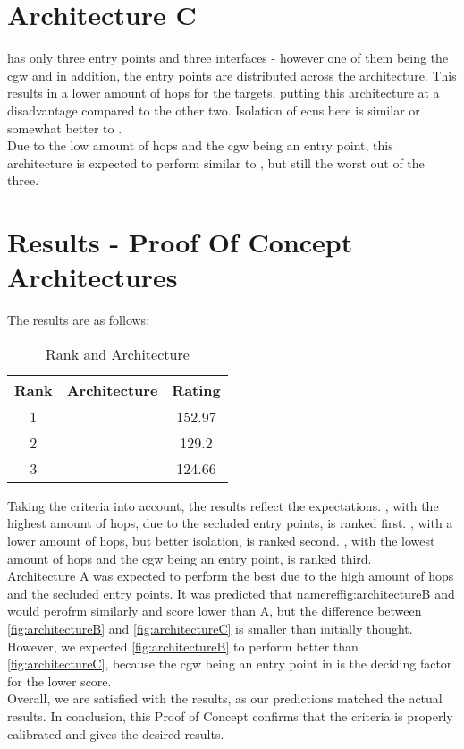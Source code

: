 \section{Architecture C}
\label{sec:archc}

 has only three entry points and three interfaces - however one of them being the \gls{cgw} and 
in addition, the entry points are distributed across the architecture. 
This results in a lower amount of hops for the targets, putting this architecture at a disadvantage compared to the other two.
Isolation of \gls{ecu}s here is similar or somewhat better to .\\
Due to the low amount of hops and the \gls{cgw} being an entry point, this architecture is expected to perform 
similar to , but still the worst out of the three.


\section{Results - Proof Of Concept Architectures}
\label{sec:resultsproof}

The results are as follows:

\begin{table}[h]
    \label{table:survey}
    \centering
    \caption{Rank and Architecture}
    \begin{tabular}{ |c|c|c| } 
    \hline
    Rank & Architecture & Rating\\
    \hline
    1 & \nameref{fig:architectureA} & 152.97\\ 
    2 & \nameref{fig:architectureB} & 129.2\\
    3 & \nameref{fig:architectureC} & 124.66\\
    \hline
    \end{tabular}
\end{table}

Taking the criteria into account, the results reflect the expectations.
, with the highest amount of hops, due to the secluded entry points, is ranked first.
, with a lower amount of hops, but better isolation, is ranked second.
, with the lowest amount of hops and the \gls{cgw} being an entry point, is ranked third.\\

Architecture A was expected to perform the best due to the high amount of hops and the secluded entry points.
It was predicted that nameref{fig:architectureB} and  would perofrm similarly and score lower than A,
but the difference between \ref{fig:architectureB} and \ref{fig:architectureC} is smaller than initially thought. 
However, we expected \ref{fig:architectureB} to perform better than \ref{fig:architectureC}, 
because the \gls{cgw} being an entry point in  is the deciding factor for the lower score.\\

Overall, we are satisfied with the results, as our predictions matched the actual results.
In conclusion, this Proof of Concept confirms that the criteria is properly calibrated and gives the desired results.